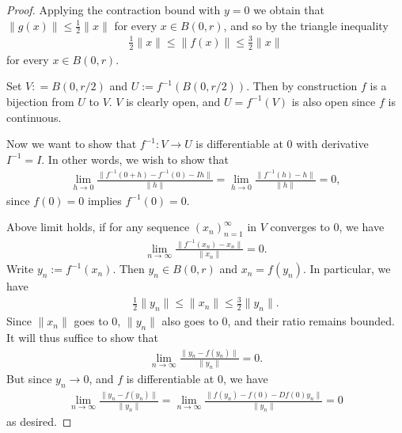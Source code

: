 \begin{proof}
    Applying the contraction bound with $y = 0$ we obtain that $\|g(x)\| \leq \frac{1}{2}\|x\|$ for every $x \in B(0, r)$, and so by the triangle inequality
        \begin{align*}
            \frac{1}{2}\|x\| \leq \|f(x)\| \leq \frac{3}{2}\|x\|
        \end{align*}
for every $x \in B(0, r)$.

    Set $V : = B(0, r/2)$ and $U := f^{-1}(B(0, r/2))$. Then by construction $f$ is a bijection from $U$ to $V$. $V$ is clearly open, and $U = f^{-1}(V)$ is also open since $f$ is continuous.

    Now we want to show that $f^{-1} : V \to U$ is differentiable at $0$ with derivative $I^{-1} = I$. In other words, we wish to show that
        \begin{align*}
            \lim_{h \to 0}\frac{\|f^{-1}(0 + h) - f^{-1}(0) - Ih\|}{\|h\|}
            = \lim_{h \to 0}\frac{\|f^{-1}(h) - h\|}{\|h\|}
            = 0,
        \end{align*}
since $f(0) = 0$ implies $f^{-1}(0) = 0$.

Above limit holds, if for any sequence $(x_n)_{n = 1}^{\infty}$ in $V$ converges to $0$, we have
        \begin{align*}
            \lim_{n \to \infty}\frac{\|f^{-1}(x_n) - x_n\|}{\|x_n\|} = 0.
        \end{align*}
    Write $y_n := f^{-1}(x_n)$. Then $y_n \in B(0, r)$ and $x_n = f(y_n)$. In particular, we have
        \begin{align*}
            \frac{1}{2}\|y_n\| \leq \|x_n\| \leq \frac{3}{2}\|y_n\|.
        \end{align*}
    Since $\|x_n\|$ goes to $0$, $\|y_n\|$ also goes to $0$, and their ratio remains bounded. It will thus suffice to show that
        \begin{align*}
            \lim_{n \to \infty}\frac{\|y_n - f(y_n)\|}{\|y_n\|} = 0.
        \end{align*}
    But since $y_n \to 0$, and $f$ is differentiable at $0$, we have
        \begin{align*}
            \lim_{n \to \infty}\frac{\|y_n - f(y_n)\|}{\|y_n\|}
            = \lim_{n \to \infty}\frac{\|f(y_n) - f(0) - Df(0)y_n\|}{\|y_n\|} = 0
        \end{align*}
    as desired.
\end{proof}
